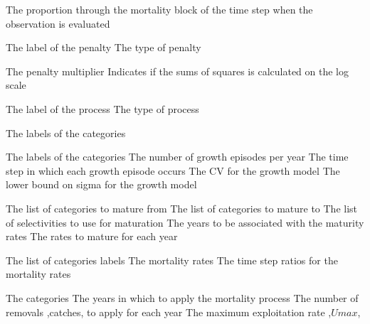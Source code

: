  {The proportion through the mortality block of the time step when the observation is evaluated}
\par\par
{} {The label of the penalty}
 {The type of penalty}
\par\textbf{}\par
{} {The penalty multiplier}
 {Indicates if the sums of squares is calculated on the log scale}
\par\par
{} {The label of the process}
 {The type of process}
\par\textbf{}\par
{} {The labels of the categories}
\par\textbf{}\par
{} {The labels of the categories}
 {The number of growth episodes per year}
 {The time step in which each growth episode occurs}
 {The CV for the growth model}
 {The lower bound on sigma for the growth model}
\par\textbf{}\par
{} {The list of categories to mature from}
 {The list of categories to mature to}
 {The list of selectivities to use for maturation}
 {The years to be associated with the maturity rates}
 {The rates to mature for each year}
\par\textbf{}\par
{} {The list of categories labels}
 {The mortality rates}
 {The time step ratios for the mortality rates}
\par\textbf{}\par
{} {The categories}
 {The years in which to apply the mortality process}
 {The number of removals ,catches, to apply for each year}
 {The maximum exploitation rate ,$Umax$,}
